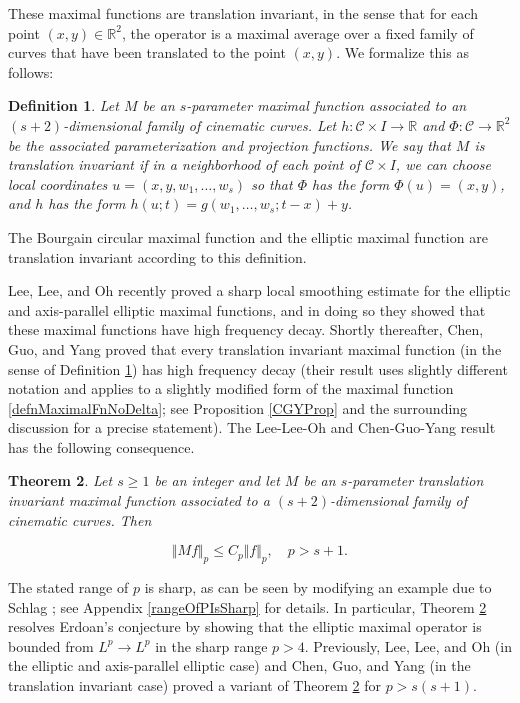 \documentclass[letterpaper, reqno,11pt]{article}
\numberwithin{equation}{section}
\newcommand{\RR}{\mathbb{R}}
\newtheorem{thm}{Theorem}
\numberwithin{thm}{section}
\newtheorem{defn}[thm]{Definition}
\theoremstyle{remark}
\begin{document}
These maximal functions are translation invariant, in the sense that for each point $(x,y)\in\RR^2$, the operator is a maximal average over a fixed family of curves that have been translated to the point $(x,y)$. We formalize this as follows:
%
\begin{defn}\label{defnTransInvariantMf}
Let $M$ be an $s$-parameter maximal function associated to an $(s+2)$-dimensional family of cinematic curves. Let $h\colon \mathcal{C}\times I\to\RR$ and $\Phi\colon \mathcal{C} \to\RR^{2}$ be the associated parameterization and projection functions. We say that $M$ is \emph{translation invariant} if in a neighborhood of each point of $\mathcal{C}\times I$, we can choose local coordinates $u=(x,y,w_1,\ldots,w_s)$ so that $\Phi$ has the form $\Phi(u) = (x,y)$, and $h$ has the form $h(u; t) = g(w_1,\ldots,w_s; t-x) + y$.
\end{defn}
%
\noindent The Bourgain circular maximal function and the elliptic maximal function are translation invariant according to this definition. 

Lee, Lee, and Oh \cite{LLO} recently proved a sharp local smoothing estimate for the elliptic and axis-parallel elliptic maximal functions, and in doing so they showed that these maximal functions have high frequency decay. Shortly thereafter, Chen, Guo, and Yang \cite{CGYv2} proved that every translation invariant maximal function (in the sense of Definition \ref{defnTransInvariantMf}) has high frequency decay (their result uses slightly different notation and applies to a slightly modified form of the maximal function \eqref{defnMaximalFnNoDelta}; see Proposition \ref{CGYProp} and the surrounding discussion for a precise statement). The Lee-Lee-Oh and Chen-Guo-Yang result has the following consequence.
%
%
\begin{thm}\label{LpMaximalFnBd}
Let $s\geq 1$ be an integer and let $M$ be an $s$-parameter translation invariant maximal function associated to a $(s+2)$-dimensional family of cinematic curves. Then

\begin{equation}\label{maximalFnBdMNoDelta}
\Vert M f\Vert_p \leq C_p\Vert f\Vert_p,\quad p> s+1. 
\end{equation}
\end{thm}
The stated range of $p$ is sharp, as can be seen by modifying an example due to Schlag \cite{Schlag}; see Appendix \ref{rangeOfPIsSharp} for details. In particular, Theorem \ref{LpMaximalFnBd} resolves Erdoan's conjecture by showing that the elliptic maximal operator is bounded from $L^p\to L^p$ in the sharp range $p>4$. Previously, Lee, Lee, and Oh \cite{LLO} (in the elliptic and axis-parallel elliptic case) and Chen, Guo, and Yang \cite{CGYv2} (in the translation invariant case) proved a variant of Theorem \ref{LpMaximalFnBd} for $p>s(s+1)$. 
\end{document}
